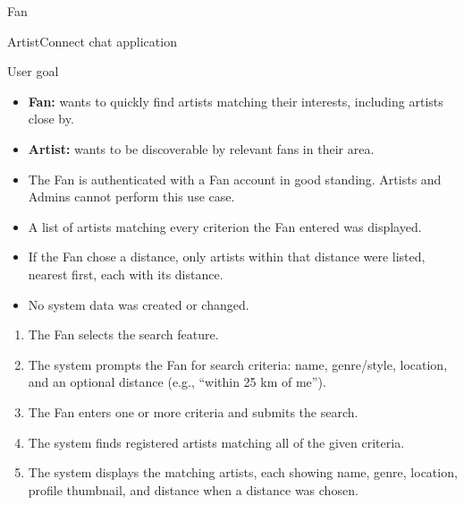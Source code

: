 \documentclass[11pt]{report}
\begin{document}
\begin{description}[leftmargin=2.2cm, style=nextline]
  \item[Primary Actor] Fan
  \item[Scope] ArtistConnect chat application
  \item[Level] User goal
  \item[Stakeholders \& Interests]
    \begin{itemize}
      \item \textbf{Fan:} wants to quickly find artists matching their interests, including artists close by.
      \item \textbf{Artist:} wants to be discoverable by relevant fans in their area.
    \end{itemize}
  \item[Preconditions]
    \begin{itemize}
      \item The Fan is authenticated with a Fan account in good standing. Artists and Admins cannot perform this use case.
    \end{itemize}
  \item[Postconditions (Success Guarantee)]
    \begin{itemize}
      \item A list of artists matching every criterion the Fan entered was displayed.
      \item If the Fan chose a distance, only artists within that distance were listed, nearest first, each with its distance.
      \item No system data was created or changed.
    \end{itemize}
  \item[Main Success Scenario]
    \begin{enumerate}
      \item The Fan selects the search feature.
      \item The system prompts the Fan for search criteria: name, genre/style, location, and an optional distance (e.g., ``within 25 km of me'').
      \item The Fan enters one or more criteria and submits the search.
      \item The system finds registered artists matching all of the given criteria.
      \item The system displays the matching artists, each showing name, genre, location, profile thumbnail, and distance when a distance was chosen.
    \end{enumerate}

\end{description}
\end{document}
